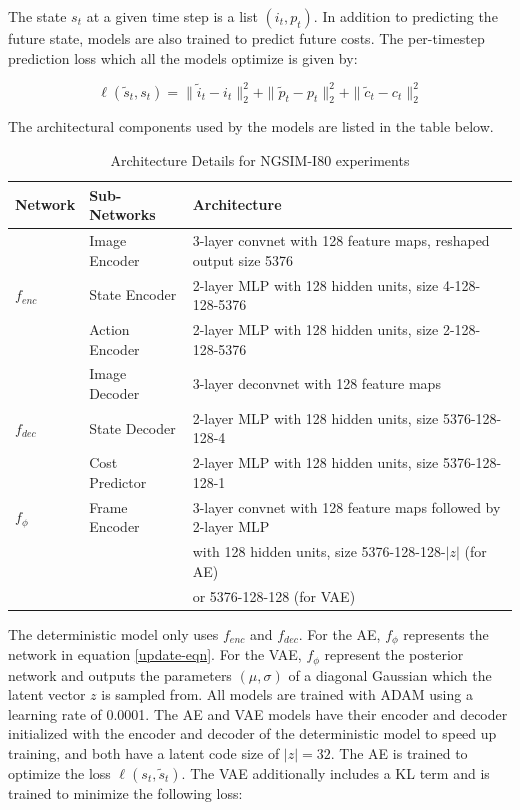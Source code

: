 \documentclass{article}
\begin{document}
The state $s_t$ at a given time step is a list $(i_t, p_t)$. In addition to predicting the future state, models are also trained to predict future costs.
The per-timestep prediction loss which all the models optimize is given by:

\begin{equation}
\ell(\tilde{s}_t, s_t) = \|\tilde{i}_t - i_t \|_2^2 + \| \tilde{p}_t - p_t \|_2^2 + \| \tilde{c}_t - c_t \|_2^2
\end{equation}

The architectural components used by the models are listed in the table below.

\begin{table}[h]
  \caption{Architecture Details for NGSIM-I80 experiments}
  \label{sample-table}
  \centering
  \begin{tabular}{lll}
    \toprule
    Network & Sub-Networks     & Architecture    \\
    \midrule
    \multirow{3}{*}{$f_{enc}$} & Image Encoder & 3-layer convnet with 128 feature maps, reshaped output size 5376 \\
    & State Encoder & 2-layer MLP with 128 hidden units, size 4-128-128-5376 \\
    & Action Encoder & 2-layer MLP with 128 hidden units, size 2-128-128-5376  \\
    \hline
        \multirow{3}{*}{$f_{dec}$} & Image Decoder & 3-layer deconvnet with 128 feature maps \\
    & State Decoder & 2-layer MLP with 128 hidden units, size 5376-128-128-4 \\
        & Cost Predictor & 2-layer MLP with 128 hidden units, size 5376-128-128-1 \\
    \hline
    $f_\phi$ & Frame Encoder & 3-layer convnet with 128 feature maps followed by 2-layer MLP \\ & & with 128 hidden units, size 5376-128-128-$|z|$ (for AE) \\
             &               & or 5376-128-128 (for VAE) \\
    \hline
    \bottomrule
  \end{tabular}
\end{table}


The deterministic model only uses $f_{enc}$ and $f_{dec}$.
For the AE, $f_\phi$ represents the network in equation \ref{update-eqn}.
For the VAE, $f_\phi$ represent the posterior network and outputs the parameters $(\mu, \sigma)$ of a diagonal Gaussian which the latent vector $z$ is sampled from.
All models are trained with ADAM \citep{ADAM} using a learning rate of 0.0001.
The AE and VAE models have their encoder and decoder initialized with the encoder and decoder of the deterministic model to speed up training, and both have a latent code size of $|z|=32$.
The AE is trained to optimize the loss $\ell(s_t, \tilde{s}_t)$.
The VAE additionally includes a KL term and is trained to minimize the following loss:
\end{document}
